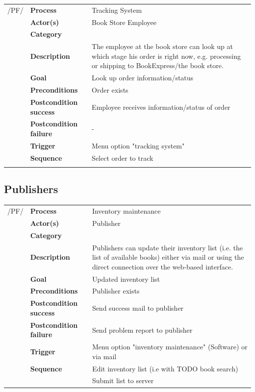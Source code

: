 \documentclass[11pt,a4paper,oneside,svgnames]{report}
\begin{document}
\noindent
\begin{tabular}{p{1.5cm}p{3cm}p{8cm}}
/PF/	& \textbf{Process} & Tracking System\\
		& \textbf{Actor(s)} & Book Store Employee\\
		& \textbf{Category} & \\
		& \textbf{Description}	 & The employee at the book store can look up at which stage his order is right now, e.g. processing or shipping to BookExpress/the book store.\\
		& \textbf{Goal} & Look up order information/status\\
		& \textbf{Preconditions} & Order exists\\
		& \textbf{Postcondition success} & Employee receives information/status of order\\
		& \textbf{Postcondition failure} & -\\
		& \textbf{Trigger} & Menu option "tracking system"\\
		& \textbf{Sequence} & Select order to track\\
		
\hfill \\
\end{tabular}

\subsection{Publishers}

\noindent
\begin{tabular}{p{1.5cm}p{3cm}p{8cm}}
/PF/	& \textbf{Process} & Inventory maintenance\\
		& \textbf{Actor(s)} & Publisher\\
		& \textbf{Category} & \\
		& \textbf{Description}	 & Publishers can update their inventory list
(i.e. the list of available books) either via mail or using the direct connection over the web-based interface.\\
		& \textbf{Goal} & Updated inventory list\\
		& \textbf{Preconditions} & Publisher exists\\
		& \textbf{Postcondition success} & Send success mail to publisher\\
		& \textbf{Postcondition failure} & Send problem report to publisher\\
		& \textbf{Trigger} & Menu option "inventory maintenance" (Software) or via mail\\
		& \textbf{Sequence} & Edit inventory list (i.e with TODO book search)\\
		& & Submit list to server
		
\hfill \\
\end{tabular}
\end{document}
